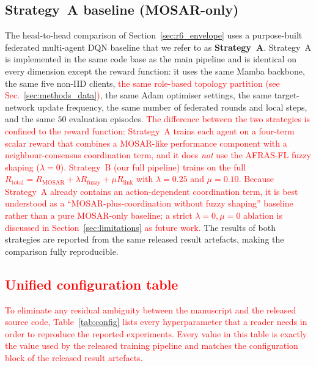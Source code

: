 \documentclass[journal]{IEEEtran}
\newcommand{\rev}[1]{\textcolor{red}{#1}}
\begin{document}
\subsection{Strategy~A baseline (MOSAR-only)}\label{sec:methods_strategy_a}

The head-to-head comparison of Section~\ref{sec:r6_envelope} uses a
purpose-built federated multi-agent DQN baseline that we refer to as
\textbf{Strategy~A}. Strategy~A is implemented in the same code base as
the main pipeline and is identical on every dimension except the reward
function: it uses the same Mamba backbone, the same five non-IID
clients, \rev{the same role-based topology partition (see Sec.~\ref{sec:methods_data})}, the same
Adam optimiser settings, the same target-network update frequency, the
same number of federated rounds and local steps, and the same $50$
evaluation episodes. \rev{The difference between the two strategies is confined to the reward function: Strategy~A trains each agent on a four-term scalar reward that combines a MOSAR-like performance component with a neighbour-consensus coordination term, and it does \emph{not} use the AFRAS-FL fuzzy shaping ($\lambda = 0$). Strategy~B (our full pipeline) trains on the full $R_{\text{total}} = R_{\text{MOSAR}} + \lambda R_{\text{fuzzy}} + \mu R_{\text{link}}$ with $\lambda = 0.25$ and $\mu = 0.10$. Because Strategy~A already contains an action-dependent coordination term, it is best understood as a ``MOSAR-plus-coordination without fuzzy shaping'' baseline rather than a pure MOSAR-only baseline; a strict $\lambda = 0, \mu = 0$ ablation is discussed in Section~\ref{sec:limitations} as future work.} The results of both strategies are
reported from the same released result artefacts, making the comparison fully reproducible.

\rev{\subsection{Unified configuration table}\label{sec:methods_config}
To eliminate any residual ambiguity between the manuscript and the
released source code, Table~\ref{tab:config} lists every hyperparameter
that a reader needs in order to reproduce the reported experiments.
Every value in this table is exactly the value used by the released
training pipeline and matches the configuration block of the released
result artefacts.}
\end{document}
